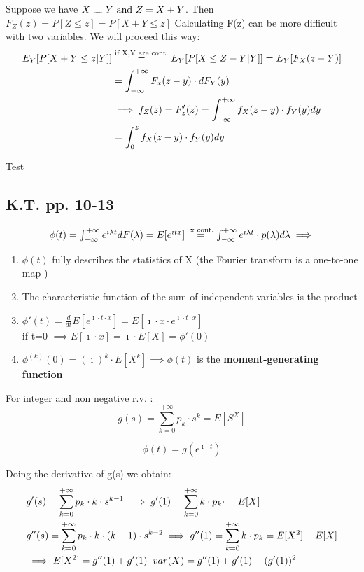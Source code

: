 Suppose we have $X \mathrel{\perp\mspace{-10mu}\perp} Y \text{ and } Z=X+Y$. Then $F_Z(z) = P[Z\le z] = P[X+Y \le z]$
Calculating F(z) can be more difficult with two variables. We will proceed this way:
\\
\begin{equation}
  $$
  \begin{split}
    E_{Y}[P[X+Y \le z | Y]]  &\stackrel{\text{if X,Y are cont.}}{=} E_Y [P[X \le Z - Y | Y]] = E_Y[F_X(z-Y)]\\
    &=\int_{-\infty}^{+\infty}F_x(z-y) \cdot dF_Y(y) \\
    &\implies f_Z(z) = F'_z(z) = \int_{-\infty}^{+\infty}{f_X(z-y)\cdot f_Y(y) dy} \\
    &=\int_{0}^{z}{f_X(z-y) \cdot f_Y(y) dy}
  \end{split}
  $$
\end{equation}

Test
\subsection{K.T. pp. 10-13}
\begin{equation}
  $$\phi(t) = \int_{-\infty}^{+\infty}e^{\imath \lambda t} dF(\lambda) = E[e^{\imath t x}]\stackrel{\text{ x cont.}}{=}
  \int_{-\infty}^{+\infty}e^{\imath \lambda t} \cdot p(\lambda) d\lambda
  \\ \implies$$
\end{equation}
\begin{enumerate}
  \item $\phi(t)$ fully describes the statistics of X (the Fourier transform is a  one-to-one map )
  \item The characteristic function of the sum of independent variables is the product
  \item $\phi'(t)=\frac{d}{dt} E[e^{\imath \cdot t \cdot x}]=E[\imath \cdot x \cdot e^{\imath \cdot t \cdot x}]$ \\
  if t=0 $\implies E[\imath \cdot x]=\imath \cdot E[ X] = \phi'(0)$
  \item $\phi^{(k)}(0) = (\imath)^k \cdot E[X^k] \implies \phi(t)$ is the \textbf{moment-generating function}
\end{enumerate}


For integer and non negative r.v. :
$$g(s)=\sum\limits_{k=0}^{+\infty}p_k \cdot s^k = E[S^X]$$

$$\phi(t) = g(e^{\imath \cdot t})$$

Doing the derivative of g(s) we obtain:
\begin{equation}
   $$
  \begin{split}
    & g'(s) = \sum\limits_{k=0}^{+\infty} p_k \cdot k \cdot s^{k-1}
    \implies g'(1) = \sum\limits_{k=0}^{+\infty} k \cdot p_k \cdot = E[X] \\
    & g''(s) = \sum\limits_{k=0}^{+\infty} p_k \cdot k \cdot (k-1) \cdot s^{k-2}
    \implies g''(1) = \sum\limits_{k=0}^{+\infty} k \cdot p_k = E[X^2]-E[X] \\
    &\implies E[X^2] = g''(1)+g'(1) \; \; var(X) = g''(1)+g'(1)-(g'(1))^2
  \end{split}
  $$
\end{equation}
